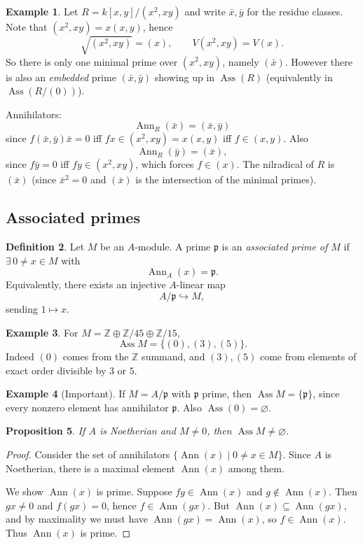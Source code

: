 \documentclass[11pt,a4paper]{article}
\theoremstyle{definition}
\newtheorem{definition}{Definition}[section]
\newtheorem{example}[definition]{Example}
\theoremstyle{plain}
\newtheorem{proposition}[definition]{Proposition}
\theoremstyle{remark}
\newcommand{\Ann}{\operatorname{Ann}}
\newcommand{\Ass}{\operatorname{Ass}}
\begin{document}
\begin{example}
Let $R=k[x,y]/(x^2,xy)$ and write $\bar x,\bar y$ for the residue classes.
Note that $(x^2,xy)=x(x,y)$, hence
\[
\sqrt{(x^2,xy)}=(x),
\qquad
V(x^2,xy)=V(x).
\]
So there is only one minimal prime over $(x^2,xy)$, namely $(\bar x)$.
However there is also an \emph{embedded} prime $(\bar x,\bar y)$ showing up in $\Ass(R)$ (equivalently in $\Ass(R/(0))$).

Annihilators:
\[
\Ann_R(\bar x)=(\bar x,\bar y)
\]
since $f(\bar x,\bar y)\bar x=0$ iff $fx\in(x^2,xy)=x(x,y)$ iff $f\in(x,y)$.
Also
\[
\Ann_R(\bar y)=(\bar x),
\]
since $f\bar y=0$ iff $fy\in (x^2,xy)$, which forces $f\in(x)$.
The nilradical of $R$ is $(\bar x)$ (since $\bar x^2=0$ and $(\bar x)$ is the intersection of the minimal primes).
\end{example}

\subsection{Associated primes}
\begin{definition}
Let $M$ be an $A$-module. A prime $\mathfrak p$ is an \emph{associated prime of $M$} if
$\exists\,0\neq x\in M$ with
\[
\Ann_A(x)=\mathfrak p.
\]
Equivalently, there exists an injective $A$-linear map
\[
A/\mathfrak p \hookrightarrow M,
\]
sending $1\mapsto x$.
\end{definition}

\begin{example}
For $M=\mathbb Z\oplus \mathbb Z/45\oplus \mathbb Z/15$,
\[
\Ass M=\{(0),(3),(5)\}.
\]
Indeed $(0)$ comes from the $\mathbb Z$ summand, and $(3),(5)$ come from elements of exact order divisible by $3$ or $5$.
\end{example}

\begin{example}[Important]
If $M=A/\mathfrak p$ with $\mathfrak p$ prime, then $\Ass M=\{\mathfrak p\}$,
since every nonzero element has annihilator $\mathfrak p$.
Also $\Ass(0)=\varnothing$.
\end{example}

\begin{proposition}
If $A$ is Noetherian and $M\neq 0$, then $\Ass M\neq\varnothing$.
\end{proposition}

\begin{proof}
Consider the set of annihilators $\{\Ann(x)\mid 0\neq x\in M\}$.
Since $A$ is Noetherian, there is a maximal element $\Ann(x)$ among them.

We show $\Ann(x)$ is prime. Suppose $fg\in\Ann(x)$ and $g\notin\Ann(x)$.
Then $gx\neq 0$ and $f(gx)=0$, hence $f\in\Ann(gx)$.
But $\Ann(x)\subseteq \Ann(gx)$, and by maximality we must have $\Ann(gx)=\Ann(x)$, so $f\in\Ann(x)$.
Thus $\Ann(x)$ is prime.
\end{proof}
\end{document}
